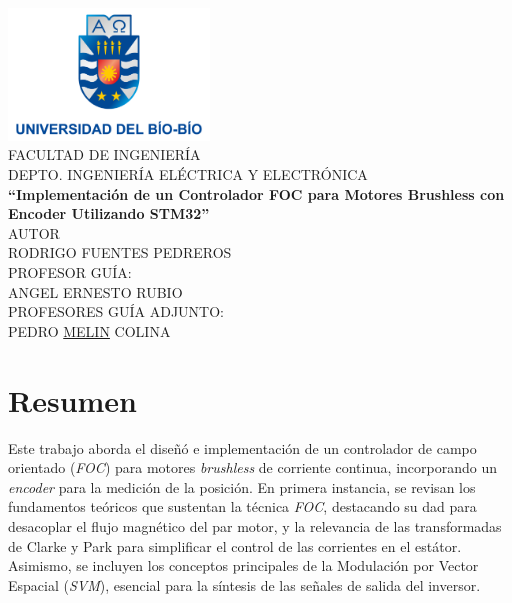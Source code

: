 \documentclass[11pt]{report}
\begin{document}
\begin{titlepage}
	\begin{center}
		\includegraphics[width=0.4\textwidth]{imagenes/logo_ubb.png}\\
		\normalsize FACULTAD DE INGENIERÍA\\
		DEPTO. INGENIERÍA ELÉCTRICA Y ELECTRÓNICA\\[2cm]

		\LARGE \textbf{``Implementación de un Controlador FOC para Motores Brushless con Encoder Utilizando STM32''}\\[5cm]

		\normalsize AUTOR\\
		RODRIGO FUENTES PEDREROS\\[3cm]

		\large PROFESOR GUÍA:\\
		\large ANGEL ERNESTO RUBIO\\[1cm]
		\large PROFESORES GUÍA ADJUNTO:\\
		\large PEDRO \href{https://youtu.be/UJwA7hu3aug?si=OvcJZs2QosQupum7&t=50}{MELIN} COLINA
	\end{center}
\end{titlepage}

\normalsize
{}
\setcounter{page}{3}

\newpage
\tableofcontents

\newpage
\listoffigures

\listoftables

\newpage
\chapter*{Resumen}

Este trabajo aborda el diseñó e implementación de un controlador de campo orientado (\emph{FOC}) para motores \emph{brushless} de corriente continua, incorporando un \emph{encoder} para la medición de la posición. En primera instancia, se revisan los fundamentos teóricos que sustentan la técnica \emph{FOC}, destacando su dad para desacoplar el flujo magnético del par motor, y la relevancia de las transformadas de Clarke y Park para simplificar el control de las corrientes en el estátor. Asimismo, se incluyen los conceptos principales de la Modulación por Vector Espacial (\emph{SVM}), esencial para la síntesis de las señales de salida del inversor.
\end{document}
